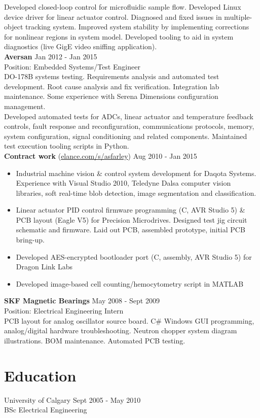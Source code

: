 \documentclass{article}
\begin{document}
Developed closed-loop control for microfluidic sample flow. Developed Linux device driver for linear actuator control. Diagnosed and fixed issues in multiple-object tracking system. Improved system stability by implementing corrections for nonlinear regions in system model. Developed tooling to aid in system diagnostics (live GigE video sniffing application). \normalsize  \\ 

\textbf{Aversan} \hrulefill Jan 2012 - Jan 2015 \\
\small Position: Embedded Systems/Test Engineer \\
DO-178B systems testing. Requirements analysis and automated test development. Root cause analysis and fix verification. Integration lab maintenance. Some experience with Serena Dimensions configuration management. \\

Developed automated tests for ADCs, linear actuator and temperature feedback controls, fault response and reconfiguration, communications protocols, memory, system configuration, signal conditioning and related components. Maintained test execution tooling scripts in Python. \normalsize  \\

\textbf{Contract work} (\href{https://www.elance.com/s/asfarley/}{elance.com/s/asfarley}) \hrulefill Aug 2010 - Jan 2015 
\small 
\begin{itemize}
	\item Industrial machine vision \& control system development for Daqota Systems. Experience with Visual Studio 2010, Teledyne Dalsa computer vision libraries, soft real-time blob detection, image segmentation and classification. 
	\item Linear actuator PID control firmware programming (C, AVR Studio 5) \& PCB layout (Eagle V5) for Precision Microdrives. Designed test jig circuit schematic and firmware. Laid out PCB, assembled prototype, initial PCB bring-up.
	\item Developed AES-encrypted bootloader port (C, assembly, AVR Studio 5) for Dragon Link Labs
	\item Developed image-based cell counting/hemocytometry script in MATLAB \\
\end{itemize}
\normalsize 

\textbf{SKF Magnetic Bearings} \hrulefill May 2008 - Sept 2009 \\
\small Position: Electrical Engineering Intern \\
PCB layout for analog oscillator source board. C\# Windows GUI programming, analog/digital hardware troubleshooting. Neutron chopper system diagram illustrations. BOM maintenance. Automated PCB testing. \normalsize \\

\section*{\large Education \normalsize}
\normalsize University of Calgary \hrulefill Sept 2005 - May 2010  \\
\small BSc Electrical Engineering \\
\end{document}
